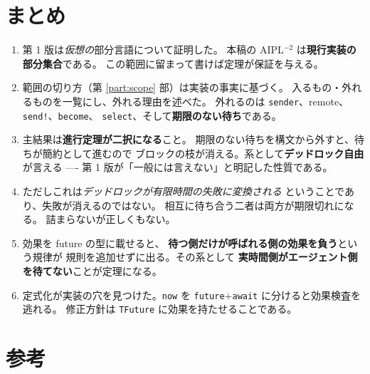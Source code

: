 \documentclass[11pt,a4paper]{ltjsarticle}
\theoremstyle{definition}
\theoremstyle{remark}
\begin{document}
\section{まとめ}

\begin{enumerate}
\item 第 1 版は\emph{仮想の}部分言語について証明した。
  本稿の AIPL$^{-2}$ は\textbf{現行実装の部分集合}である。
  この範囲に留まって書けば定理が保証を与える。

\item 範囲の切り方（第 \ref{part:scope} 部）は実装の事実に基づく。
  入るもの・外れるものを一覧にし、外れる理由を述べた。
  外れるのは \texttt{sender}、remote、\texttt{send!}、\texttt{become}、
  \texttt{select}、そして\textbf{期限のない待ち}である。

\item 主結果は\textbf{進行定理が二択になる}こと。
  期限のない待ちを構文から外すと、待ちが簡約として進むので
  ブロックの枝が消える。系として\textbf{デッドロック自由}が言える
  ---- 第 1 版が「一般には言えない」と明記した性質である。

\item ただしこれは\emph{デッドロックが有限時間の失敗に変換される}
  ということであり、失敗が消えるのではない。
  相互に待ち合う二者は両方が期限切れになる。
  詰まらないが正しくもない。

\item 効果を future の型に載せると、
  \textbf{待つ側だけが呼ばれる側の効果を負う}という規律が
  規則を追加せずに出る。その系として
  \textbf{実時間側がエージェント側を待てない}ことが定理になる。

\item 定式化が実装の穴を見つけた。\texttt{now} を
  \texttt{future}$+$\texttt{await} に分けると効果検査を逃れる。
  修正方針は \texttt{TFuture} に効果を持たせることである。
\end{enumerate}

\section*{参考}
\end{document}
